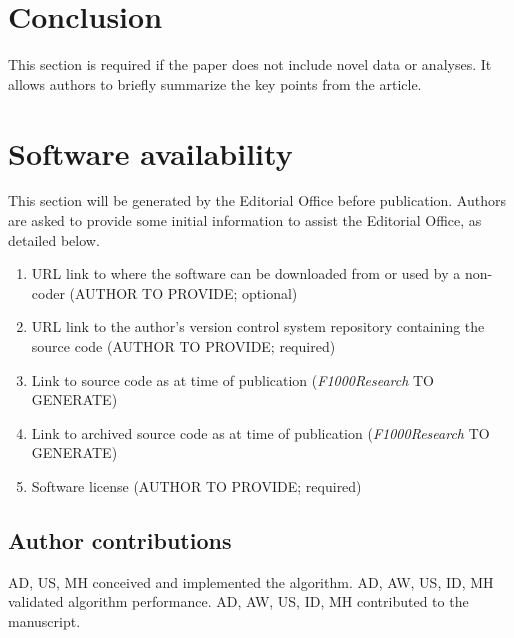 \documentclass[10pt,a4paper]{extarticle}
\begin{document}
\section*{Conclusion} %
This section is required if the paper does not include novel data or analyses.  It allows authors to briefly summarize the key points from the article.



\section*{Software availability}
This section will be generated by the Editorial Office before publication. Authors are asked to provide some initial information to assist the Editorial Office, as detailed below.
\begin{enumerate}
\item URL link to where the software can be downloaded from or used by a non-coder (AUTHOR TO PROVIDE; optional)
\item URL link to the author's version control system repository containing the source code (AUTHOR TO PROVIDE; required)
\item Link to source code as at time of publication ({\textit{F1000Research}} TO GENERATE)
\item Link to archived source code as at time of publication ({\textit{F1000Research}} TO GENERATE)
\item Software license (AUTHOR TO PROVIDE; required)
\end{enumerate}


\subsection*{Author contributions}
AD, US, MH conceived and implemented the algorithm.
AD, AW, US, ID, MH validated algorithm performance.
AD, AW, US, ID, MH contributed to the manuscript.
\end{document}
